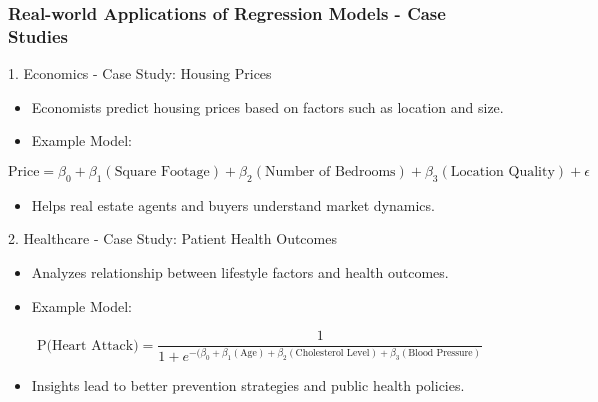 \documentclass[aspectratio=169]{beamer}
\begin{document}
\begin{frame}[fragile]
    \frametitle{Real-world Applications of Regression Models - Case Studies}
    \begin{block}{1. Economics - Case Study: Housing Prices}
        \begin{itemize}
            \item Economists predict housing prices based on factors such as location and size.
            \item Example Model:
            \end{itemize}
            \begin{equation}
            \text{Price} = \beta_0 + \beta_1(\text{Square Footage}) + \beta_2(\text{Number of Bedrooms}) + \beta_3(\text{Location Quality}) + \epsilon
            \end{equation}
            \begin{itemize}
                \item Helps real estate agents and buyers understand market dynamics.
            \end{itemize}
    \end{block}

    \begin{block}{2. Healthcare - Case Study: Patient Health Outcomes}
        \begin{itemize}
            \item Analyzes relationship between lifestyle factors and health outcomes.
            \item Example Model:
            \end{itemize}
            \begin{equation}
            \text{P(Heart Attack)} = \frac{1}{1 + e^{-(\beta_0 + \beta_1(\text{Age}) + \beta_2(\text{Cholesterol Level}) + \beta_3(\text{Blood Pressure})}}
            \end{equation}
            \begin{itemize}
                \item Insights lead to better prevention strategies and public health policies.
            \end{itemize}
    \end{block}
\end{frame}
\end{document}
